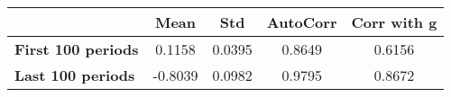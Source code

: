 \begin{tiny}\begin{tabular}{|l|c|c|c|c|}
\hline
&\textbf{Mean}&\textbf{Std}&\textbf{AutoCorr}&\textbf{Corr with g}\\\hline
\textbf{First 100 periods}&0.1158&0.0395&0.8649&0.6156\\\hline
\textbf{Last 100 periods}&-0.8039&0.0982&0.9795&0.8672\\\hline
\end{tabular}
\end{tiny}
